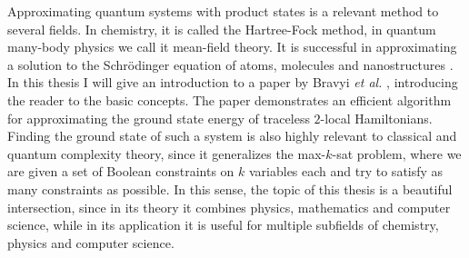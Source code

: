 Approximating quantum systems with product states is a relevant method to several fields.
In chemistry, it is called the Hartree-Fock method, in quantum many-body physics we call it mean-field theory.
It is successful in approximating a solution to the Schrödinger equation of atoms, molecules and nanostructures \cite{abdulsattar12}.\\
In this thesis I will give an introduction to a paper by Bravyi \emph{et al.} \cite{bravyi19}, introducing the reader to the basic concepts.
The paper demonstrates an efficient algorithm for approximating the ground state energy of traceless $2$-local Hamiltonians.
Finding the ground state of such a system is also highly relevant to classical and quantum complexity theory, since it generalizes the max-$k$-sat problem, where we are given a set of Boolean constraints on $k$ variables each and try to satisfy as many constraints as possible.
In this sense, the topic of this thesis is a beautiful intersection, since in its theory it combines physics, mathematics and computer science, while in its application it is useful for multiple subfields of chemistry, physics and computer science.
